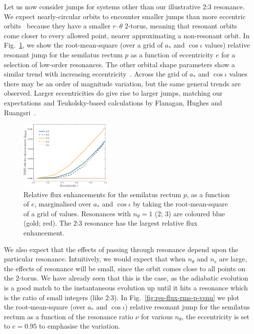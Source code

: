 \documentclass[aps,prd,amsfonts,amssymb,amsmath,nofootinbib,showpacs,superscriptaddress,twocolumn,floatfix]{revtex4-1}
\newcommand{\figref}[1]{Fig.~\ref{fig:#1}}
\begin{document}
Let us now consider jumps for systems other than our illustrative $2$:$3$ resonance. We expect nearly-circular orbits to encounter smaller jumps than more eccentric orbits~\cite{Flanagan2012} because they have a smaller $r$--$\theta$ $2$-torus, meaning that resonant orbits come closer to every allowed point, nearer approximating a non-resonant orbit. In \figref{res-flux-rms-p}, we show the root-mean-square (over a grid of $a_\ast$ and $\cos\iota$ values) relative resonant jump for the semilatus rectum $p$ as a function of eccentricity $e$ for a selection of low-order resonances. The other orbital shape parameters show a similar trend with increasing eccentricity~\cite{ColeThesis2015}. Across the grid of $a_\ast$ and $\cos\iota$ values there may be an order of magnitude variation, but the same general trends are observed. Larger eccentricities do give rise to larger jumps, matching our expectations and Teukolsky-based calculations by Flanagan, Hughes and Ruangsri~\cite{Flanagan2012a}.

\begin{figure}
\centering
\includegraphics[width=0.4\textwidth]{Fig_e_rms_p}
\caption{\label{fig:res-flux-rms-p}Relative flux enhancements for the semilatus rectum $p$, as a function of $e$, marginalised over $a_\ast$ and $\cos\iota$ by taking the root-mean-square of a grid of values. Resonances with $n_\theta = 1$ ($2$; $3$) are coloured blue (gold; red). The $2$:$3$ resonance has the largest relative flux enhancement.}
\end{figure}

We also expect that the effects of passing through resonance depend upon the particular resonance. Intuitively, we would expect that when $n_\theta$ and $n_r$ are large, the effects of resonance will be small, since the orbit comes close to all points on the $2$-torus. We have already seen that this is the case, as the adiabatic evolution is a good match to the instantaneous evolution up until it hits a resonance which is the ratio of small integers (like $2$:$3$). In \figref{res-flux-rms-p-vsnu} we plot the root-mean-square (over $a_\ast$ and $\cos\iota$) relative resonant jump for the semilatus rectum as a function of the resonance ratio $\nu$ for various $n_\theta$, the eccentricity is set to $e=0.95$ to emphasise the variation.
\end{document}

